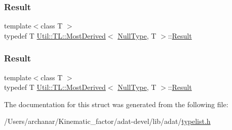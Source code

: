 \mbox{\label{structUtil_1_1TL_1_1MostDerived_3_01NullType_00_01T_01_4_a67aeb01e6a29f0a07798b8626b0d69c2}} 
\subsubsection{\texorpdfstring{Result}{Result}\hspace{0.1cm}{\footnotesize\ttfamily [2/3]}}
{\footnotesize\ttfamily template$<$class T $>$ \\
typedef T \mbox{\hyperlink{structUtil_1_1TL_1_1MostDerived}{Util\+::\+T\+L\+::\+Most\+Derived}}$<$ \mbox{\hyperlink{classUtil_1_1NullType}{Null\+Type}}, T $>$\+::\mbox{\hyperlink{structUtil_1_1TL_1_1MostDerived_3_01NullType_00_01T_01_4_a67aeb01e6a29f0a07798b8626b0d69c2}{Result}}}

\mbox{\label{structUtil_1_1TL_1_1MostDerived_3_01NullType_00_01T_01_4_a67aeb01e6a29f0a07798b8626b0d69c2}} 
\subsubsection{\texorpdfstring{Result}{Result}\hspace{0.1cm}{\footnotesize\ttfamily [3/3]}}
{\footnotesize\ttfamily template$<$class T $>$ \\
typedef T \mbox{\hyperlink{structUtil_1_1TL_1_1MostDerived}{Util\+::\+T\+L\+::\+Most\+Derived}}$<$ \mbox{\hyperlink{classUtil_1_1NullType}{Null\+Type}}, T $>$\+::\mbox{\hyperlink{structUtil_1_1TL_1_1MostDerived_3_01NullType_00_01T_01_4_a67aeb01e6a29f0a07798b8626b0d69c2}{Result}}}



The documentation for this struct was generated from the following file\+:\begin{DoxyCompactItemize}
\item 
/\+Users/archanar/\+Kinematic\+\_\+factor/adat-\/devel/lib/adat/\mbox{\hyperlink{adat-devel_2lib_2adat_2typelist_8h}{typelist.\+h}}\end{DoxyCompactItemize}
